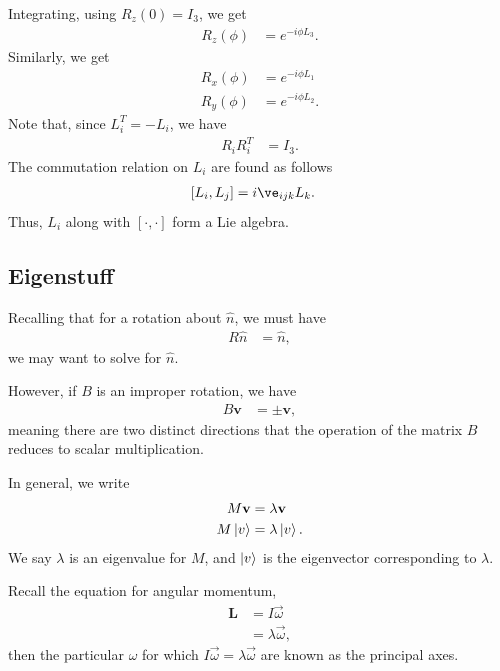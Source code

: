 \documentclass[10pt]{mypackage}
\begin{document}
Integrating, using $R_z\left(0\right) = I_{3}$, we get
\begin{align*}
  R_z\left(\phi\right) &= e^{-i\phi L_{3}}.
\end{align*}
Similarly, we get
\begin{align*}
  R_x\left(\phi\right) &= e^{-i\phi L_{1}}\\
  R_y\left(\phi\right) &= e^{-i\phi L_{2}}.
\end{align*}
Note that, since $L_{i}^{T} = -L_{i}$, we have
\begin{align*}
  R_{i}R_{i}^T &= I_{3}.
\end{align*}
The commutation relation on $L_{i}$ are found as follows
\begin{align*}
  \left[L_{i},L_{j}\right] &= i\ve_{ijk}L_{k}.
\end{align*}
Thus, $L_{i}$ along with $\left[\cdot,\cdot\right]$ form a Lie algebra.
\subsection{Eigenstuff}%
Recalling that for a rotation about $\widehat{n}$, we must have
\begin{align*}
  R\widehat{n} &= \widehat{n},
\end{align*}
we may want to solve for $\widehat{n}$.\newline

However, if $B$ is an improper rotation, we have
\begin{align*}
  B\mathbf{v} &= \pm\mathbf{v},
\end{align*}
meaning there are two distinct directions that the operation of the matrix $B$ reduces to scalar multiplication.\newline

In general, we write
\begin{align*}
  M\mathbf{v} &= \lambda \mathbf{v}\\
  M\ket{v} &= \lambda \ket{v}.
\end{align*}
We say $\lambda$ is an eigenvalue for $M$, and $\ket{v}$ is the eigenvector corresponding to $\lambda$.\newline

Recall the equation for angular momentum,
\begin{align*}
  \mathbf{L} &= I\vec{\omega}\\
             &= \lambda \vec{\omega},
\end{align*}
then the particular $\omega$ for which $I\vec{\omega} = \lambda \vec{\omega}$ are known as the principal axes.
\end{document}

